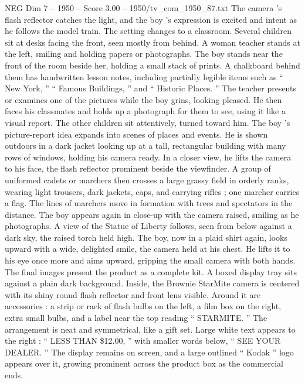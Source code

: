 \begin{textsample}{NEG Dim 7 – 1950 – Score 3.00 – 1950/tv\_com\_1950\_87.txt}
The camera ’s flash reflector catches the light, and the boy ’s expression is excited and intent as he follows the model train.
The setting changes to a classroom.
Several children sit at desks facing the front, seen mostly from behind.
A woman teacher stands at the left, smiling and holding papers or photographs.
The boy stands near the front of the room beside her, holding a small stack of prints.
A chalkboard behind them has handwritten lesson notes, including partially legible items such as “ New York, ” “ Famous Buildings, ” and “ Historic Places. ” The teacher presents or examines one of the pictures while the boy grins, looking pleased.
He then faces his classmates and holds up a photograph for them to see, using it like a visual report.
The other children sit attentively, turned toward him.
The boy ’s picture-report idea expands into scenes of places and events.
He is shown outdoors in a dark jacket looking up at a tall, rectangular building with many rows of windows, holding his camera ready.
In a closer view, he lifts the camera to his face, the flash reflector prominent beside the viewfinder.
A group of uniformed cadets or marchers then crosses a large grassy field in orderly ranks, wearing light trousers, dark jackets, caps, and carrying rifles ; one marcher carries a flag.
The lines of marchers move in formation with trees and spectators in the distance.
The boy appears again in close-up with the camera raised, smiling as he photographs.
A view of the Statue of Liberty follows, seen from below against a dark sky, the raised torch held high.
The boy, now in a plaid shirt again, looks upward with a wide, delighted smile, the camera held at his chest.
He lifts it to his eye once more and aims upward, gripping the small camera with both hands.
The final images present the product as a complete kit.
A boxed display tray sits against a plain dark background.
Inside, the Brownie StarMite camera is centered with its shiny round flash reflector and front lens visible.
Around it are accessories : a strip or rack of flash bulbs on the left, a film box on the right, extra small bulbs, and a label near the top reading “ STARMITE. ” The arrangement is neat and symmetrical, like a gift set.
Large white text appears to the right : “ LESS THAN \$12.00, ” with smaller words below, “ SEE YOUR DEALER. ” The display remains on screen, and a large outlined “ Kodak ” logo appears over it, growing prominent across the product box as the commercial ends.

\end{textsample}
